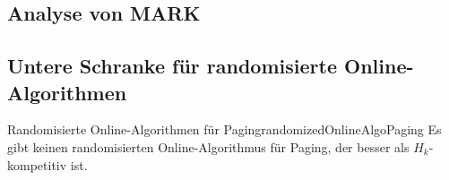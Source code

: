 \documentclass[language=ngerman,algolist]{TemplateLecture}
\begin{document}

\subsection{Analyse von MARK}


\subsection{Untere Schranke für randomisierte Online-Algorithmen}

\begin{thm}{Randomisierte Online-Algorithmen für Paging}{randomizedOnlineAlgoPaging}
    Es gibt keinen randomisierten Online-Algorithmus für Paging, der besser als $H_k$-kompetitiv ist.
\end{thm}
\end{document}
